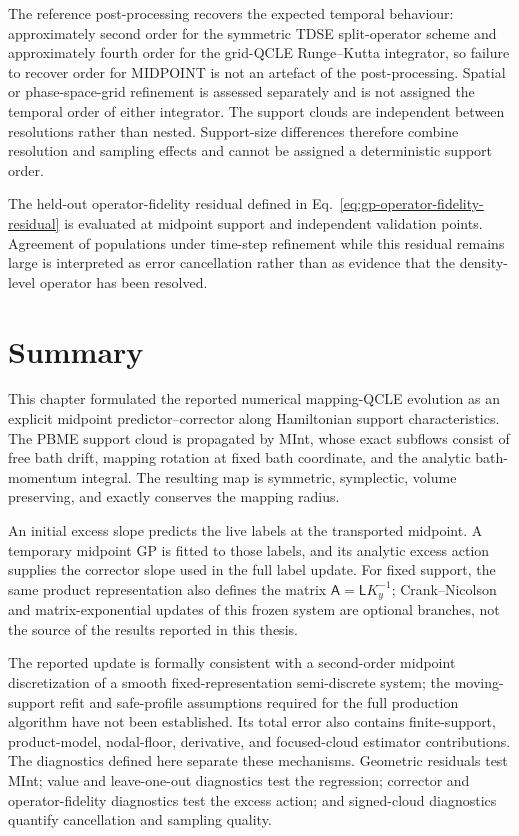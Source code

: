 \documentclass[
  11pt,
  letterpaper,
  onehalfspacing,
  normalmargins,
  equalmargins,
  oneside
]{ut-thesis}
\begin{document}
The reference post-processing recovers the expected temporal behaviour:
approximately second order for the symmetric TDSE split-operator scheme and
approximately fourth order for the grid-QCLE Runge--Kutta integrator, so
failure to recover order for MIDPOINT is not an artefact of the
post-processing. Spatial or phase-space-grid refinement is assessed
separately and is not assigned the temporal order of either integrator. The support clouds are independent between resolutions rather
than nested. Support-size differences therefore combine resolution and
sampling effects and cannot be assigned a deterministic support order.

The held-out operator-fidelity residual defined in
Eq.~\eqref{eq:gp-operator-fidelity-residual} is evaluated at midpoint support
and independent validation points. Agreement of populations under time-step
refinement while this residual remains large is interpreted as error
cancellation rather than as evidence that the density-level operator has been
resolved.


\section{Summary}
\label{sec:ch5-summary}

This chapter formulated the reported numerical mapping-QCLE evolution as an
explicit midpoint predictor--corrector along Hamiltonian support
characteristics. The PBME support cloud is propagated by MInt, whose exact
subflows consist of free bath drift, mapping rotation at fixed bath
coordinate, and the analytic bath-momentum integral. The resulting map is
symmetric, symplectic, volume preserving, and exactly conserves the mapping
radius.

An initial excess slope predicts the live labels at the transported midpoint.
A temporary midpoint GP is fitted to those labels, and its analytic excess
action supplies the corrector slope used in the full label update. For fixed
support, the same product representation also defines the matrix
\(\mathsf A=\mathsf L K_y^{-1}\); Crank--Nicolson and matrix-exponential
updates of this frozen system are optional branches, not the source of the
results reported in this thesis.

The reported update is formally consistent with a second-order midpoint
discretization of a smooth fixed-representation semi-discrete system; the
moving-support refit and safe-profile assumptions required for the full
production algorithm have not been established. Its total error also contains
finite-support, product-model, nodal-floor,
derivative, and focused-cloud estimator contributions. The diagnostics defined
here separate these mechanisms. Geometric residuals test MInt; value and
leave-one-out diagnostics test the regression; corrector and operator-fidelity
diagnostics test the excess action; and signed-cloud diagnostics quantify
cancellation and sampling quality.
\end{document}
